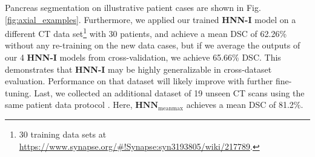 \documentclass[journal]{IEEEtran}
\begin{document}

Pancreas segmentation on illustrative patient cases are shown in Fig. \ref{fig:axial_examples}. Furthermore, we applied our trained \textbf{HNN-I} model on a different CT data set\footnote{\scriptsize 30 training data sets at \url{https://www.synapse.org/\#!Synapse:syn3193805/wiki/217789}.} with 30 patients, and achieve a mean DSC of 62.26\% without any re-training on the new data cases, but if we average the outputs of our 4 \textbf{HNN-I} models from cross-validation, we achieve 65.66\% DSC. This demonstrates that \textbf{HNN-I} may be highly generalizable in cross-dataset evaluation. Performance on that dataset will likely improve with further fine-tuning. Last, we collected an additional dataset of 19 unseen CT scans using the same patient data protocol \cite{roth2015deeporgan,roth2016spatial}. Here, $\mathbf{HNN}_\mathrm{meanmax}$ achieves a mean DSC of 81.2\%.  
\end{document}
